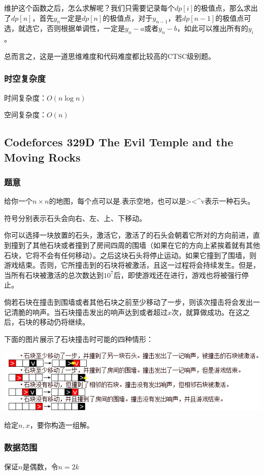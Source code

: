 \documentclass{ctexart}
\begin{document}
维护这个函数之后，怎么求解呢？我们只需要记录每个$dp[i]$的极值点，那么求出了$dp[n]$，首先$y_n$一定是$dp[n]$的极值点，对于$y_{n-1}$，若$dp[n-1]$的极值点可选，就选它，否则根据单调性，一定是$y_n-a$或者$y_n-b$，如此可以推出所有的$y_i$。

总而言之，这是一道思维难度和代码难度都比较高的CTSC级别题。
\subsubsection{时空复杂度}
时间复杂度：$O(n \log n)$

空间复杂度：$O(n)$
\subsection{Codeforces 329D The Evil Temple and the Moving Rocks}
\subsubsection{题意}
给你一个$n \times n$的地图，每个点可以是.表示空地，也可以是><\^{}v表示一种石头。

符号分别表示石头会向右、左、上、下移动。

你可以选择一块放置的石头，激活它，激活了的石头会朝着它所对的方向前进，直到撞到了其他石块或者撞到了房间四周的围墙（如果在它的方向上紧挨着就有其他石块，它将不会有任何移动）。之后这块石头将停止运动。如果它撞到了围墙，则游戏结束。否则，它所撞击到的石块将被激活，且这一过程将会持续发生。但是，当所有石块被激活的总次数达到$10^7$后，即使游戏还在进行，游戏也将被强行停止。

倘若石块在撞击到围墙或者其他石块之前至少移动了一步，则该次撞击将会发出一记清脆的响声。当石块撞击发出的响声达到或者超过$x$次，就算做成功。在这之后，石块的移动仍将继续。

下面的图片展示了石块撞击时可能的四种情形：

\includegraphics{temple.png}

给定$n,x$，要你构造一组解。
\subsubsection{数据范围}
保证$n$是偶数，令$n=2k$
\end{document}
